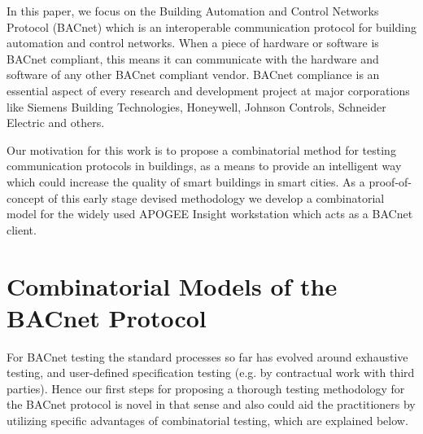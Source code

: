 \documentclass[runningheads]{llncs}
\newcommand{\apogee}{APOGEE Insight\textsuperscript{\tiny{\textregistered}}}
\begin{document}
In this paper, we focus on the Building Automation and Control Networks Protocol (BACnet) which is an interoperable communication
protocol for building automation and control networks. When a piece of hardware or software is BACnet compliant,
this means it can communicate with the hardware and software of any other BACnet compliant vendor.
BACnet compliance is an essential aspect of every research and development
project at major corporations like Siemens Building Technologies, Honeywell, Johnson Controls,
Schneider Electric and others.

Our motivation for this work is to propose a combinatorial method for testing communication protocols in buildings,
as a means to provide an intelligent way which could increase the quality of smart buildings in smart cities.
As a proof-of-concept of this early stage devised methodology we develop a combinatorial model for the widely used \apogee{}
workstation which acts as a BACnet client.



\section{Combinatorial Models of the BACnet Protocol}

For BACnet testing the standard processes so far has evolved around exhaustive testing,
and user-defined specification testing (e.g. by contractual work with third parties).
Hence our first steps for proposing a thorough testing methodology for the BACnet protocol
is novel in that sense and also could aid the practitioners by utilizing specific advantages of combinatorial testing, which
are explained below.
\end{document}
